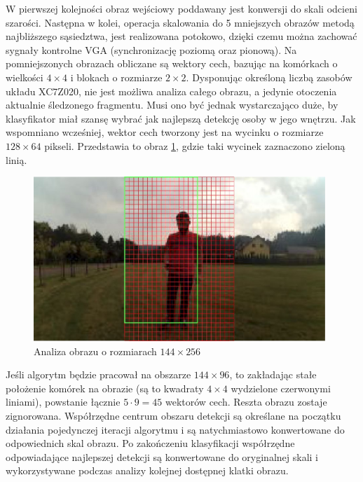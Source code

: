 W pierwszej kolejności obraz wejściowy poddawany jest konwersji do skali odcieni szarości. 
Następna w kolei, operacja skalowania do 5 mniejszych obrazów metodą najbliższego sąsiedztwa, jest realizowana potokowo, dzięki czemu można zachować sygnały kontrolne VGA (synchronizację poziomą oraz pionową). %
Na pomniejszonych obrazach obliczane są wektory cech, bazując na komórkach o wielkości $4\times 4$ i blokach o rozmiarze $2\times2$. 
Dysponując określoną liczbą zasobów układu XC7Z020, nie jest możliwa analiza całego obrazu, a jedynie otoczenia aktualnie śledzonego fragmentu.
Musi ono być jednak wystarczająco duże, by klasyfikator miał szansę wybrać jak najlepszą detekcję osoby w jego wnętrzu. 
Jak wspomniano wcześniej, wektor cech tworzony jest na wycinku o rozmiarze $128\times 64$ pikseli. 
Przedstawia to obraz \ref{fig:HOG_mesh}, gdzie taki wycinek zaznaczono zieloną linią. %

\begin{figure}[h]
	\centering
	\includegraphics[width=11cm]{4_scaled_hog_example.jpg}
	\caption{Analiza obrazu o rozmiarach $144\times 256$}
	\label{fig:HOG_mesh}
\end{figure}

Jeśli algorytm będzie pracował na obszarze $144\times 96$, to zakładając stałe położenie komórek na obrazie (są to kwadraty $4\times4$ wydzielone czerwonymi liniami), powstanie łącznie $5\cdot9=45$ wektorów cech. 
Reszta obrazu zostaje zignorowana. 
Współrzędne centrum obszaru detekcji są określane na początku działania pojedynczej iteracji algorytmu i są natychmiastowo konwertowane do odpowiednich skal obrazu. Po zakończeniu klasyfikacji współrzędne odpowiadające najlepszej detekcji są konwertowane do oryginalnej skali i wykorzystywane podczas analizy kolejnej dostępnej klatki obrazu.

